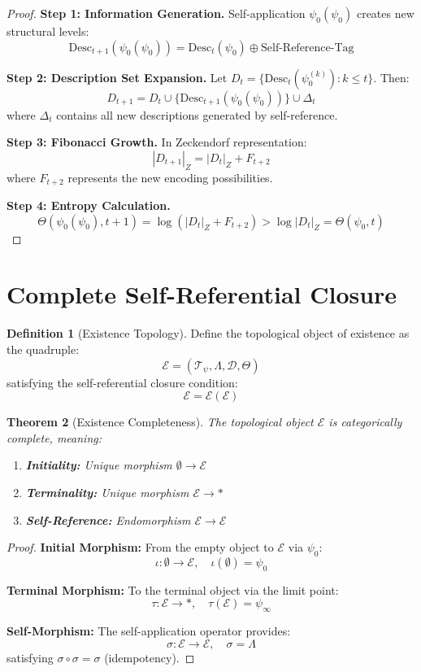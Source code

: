 \documentclass[12pt]{article}
\theoremstyle{plain}
\newtheorem{theorem}{Theorem}[section]
\theoremstyle{definition}
\newtheorem{definition}[theorem]{Definition}
\begin{document}
\begin{proof}
\textbf{Step 1: Information Generation.}
Self-application $\psi_0(\psi_0)$ creates new structural levels:
$$\text{Desc}_{t+1}(\psi_0(\psi_0)) = \text{Desc}_t(\psi_0) \oplus \text{Self-Reference-Tag}$$

\textbf{Step 2: Description Set Expansion.}
Let $D_t = \{\text{Desc}_t(\psi_0^{(k)}) : k \leq t\}$. Then:
$$D_{t+1} = D_t \cup \{\text{Desc}_{t+1}(\psi_0(\psi_0))\} \cup \Delta_t$$
where $\Delta_t$ contains all new descriptions generated by self-reference.

\textbf{Step 3: Fibonacci Growth.}
In Zeckendorf representation:
$$|D_{t+1}|_Z = |D_t|_Z + F_{t+2}$$
where $F_{t+2}$ represents the new encoding possibilities.

\textbf{Step 4: Entropy Calculation.}
$$\Theta(\psi_0(\psi_0), t+1) = \log(|D_t|_Z + F_{t+2}) > \log |D_t|_Z = \Theta(\psi_0, t)$$
\end{proof}

\section{Complete Self-Referential Closure}

\begin{definition}[Existence Topology]
Define the topological object of existence as the quadruple:
$$\mathcal{E} = (\mathcal{T}_\psi, \Lambda, \mathcal{D}, \Theta)$$
satisfying the self-referential closure condition:
$$\mathcal{E} = \mathcal{E}(\mathcal{E})$$
\end{definition}

\begin{theorem}[Existence Completeness]
\label{thm:existence-complete}
The topological object $\mathcal{E}$ is categorically complete, meaning:
\begin{enumerate}
\item \textbf{Initiality:} Unique morphism $\emptyset \to \mathcal{E}$
\item \textbf{Terminality:} Unique morphism $\mathcal{E} \to *$
\item \textbf{Self-Reference:} Endomorphism $\mathcal{E} \to \mathcal{E}$
\end{enumerate}
\end{theorem}

\begin{proof}
\textbf{Initial Morphism:} From the empty object to $\mathcal{E}$ via $\psi_0$:
$$\iota: \emptyset \to \mathcal{E}, \quad \iota(\emptyset) = \psi_0$$

\textbf{Terminal Morphism:} To the terminal object via the limit point:
$$\tau: \mathcal{E} \to *, \quad \tau(\mathcal{E}) = \psi_\infty$$

\textbf{Self-Morphism:} The self-application operator provides:
$$\sigma: \mathcal{E} \to \mathcal{E}, \quad \sigma = \Lambda$$
satisfying $\sigma \circ \sigma = \sigma$ (idempotency).
\end{proof}
\end{document}
